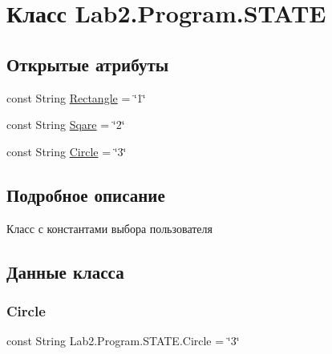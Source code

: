 \hypertarget{class_lab2_1_1_program_1_1_s_t_a_t_e}{}\section{Класс Lab2.\+Program.\+S\+T\+A\+TE}
\label{class_lab2_1_1_program_1_1_s_t_a_t_e}
\subsection*{Открытые атрибуты}
\begin{DoxyCompactItemize}
\item 
const String \hyperlink{class_lab2_1_1_program_1_1_s_t_a_t_e_a7e20c40f4173c5b32eea8e3b8c9a41ea}{Rectangle} = \char`\"{}1\char`\"{}
\item 
const String \hyperlink{class_lab2_1_1_program_1_1_s_t_a_t_e_a38e1a16e8f362a6c14580625b94cc191}{Sqare} = \char`\"{}2\char`\"{}
\item 
const String \hyperlink{class_lab2_1_1_program_1_1_s_t_a_t_e_abfa46dc8209ae33faad2a798dab636ab}{Circle} = \char`\"{}3\char`\"{}
\end{DoxyCompactItemize}


\subsection{Подробное описание}
Класс с константами выбора пользователя 

\subsection{Данные класса}
\mbox{\label{class_lab2_1_1_program_1_1_s_t_a_t_e_abfa46dc8209ae33faad2a798dab636ab}} 
\subsubsection{\texorpdfstring{Circle}{Circle}}
{\footnotesize\ttfamily const String Lab2.\+Program.\+S\+T\+A\+T\+E.\+Circle = \char`\"{}3\char`\"{}}

\mbox{\label{class_lab2_1_1_program_1_1_s_t_a_t_e_a7e20c40f4173c5b32eea8e3b8c9a41ea}} 

